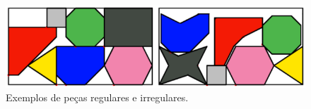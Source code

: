 \begin{figure}[!htb]
    \centering
    \caption{Exemplos de peças regulares e irregulares.}
    \label{fig:pieces-example}
    \includegraphics[scale=0.7]{utils/images/pieces-example}
\end{figure}
